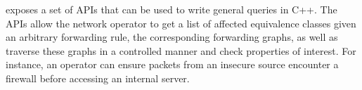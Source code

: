 {%

\name exposes a set of APIs that can be used to write general queries in C++.
The APIs allow the network operator to get a list of affected equivalence 
classes given an arbitrary forwarding rule, the corresponding 
forwarding graphs, as well as traverse these graphs in a controlled manner 
and check properties of interest. For instance, an operator can ensure
packets from an insecure source encounter a firewall before accessing an internal server.
}

